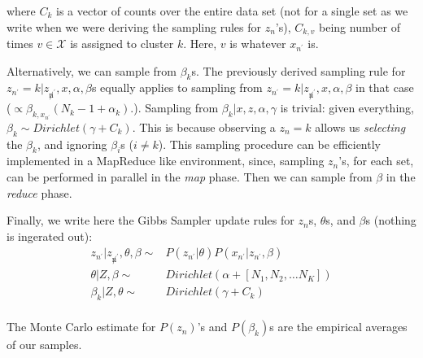 \documentclass{article}%
\begin{document}
where $C_k$ is a vector of counts over the entire data set (not for a single set as we write when we were deriving the sampling rules for $z_n$'s), $C_{k,v}$ being number of times $v\in \mathcal{X}$ is assigned to cluster $k$. Here, $v$ is whatever $x_{n^\prime}$ is. 

Alternatively, we can sample from $\beta_k$s. The previously derived sampling rule for $z_{n^\prime} = k|z_{\not n^\prime}, x, \alpha, \beta$s equally applies to sampling from  $z_{n^\prime} = k|z_{\not n^\prime}, x, \alpha, \beta$ in that case ($ \propto \beta_{k, x_{n^\prime}} (N_k - 1 + \alpha_k).
$). Sampling from $\beta_k|x,z,\alpha,\gamma$ is trivial: given everything, $\beta_k \sim Dirichlet(\gamma + C_k)$. This is because observing a $z_n = k$ allows us \textit{selecting} the $\beta_k$, and ignoring $\beta_{i}$s ($i\neq k$). This sampling procedure can be efficiently implemented in a MapReduce like environment, since, sampling $z_n$'s, for each set, can be performed in parallel in the \textit{map} phase. Then we can sample from $\beta$ in the \textit{reduce} phase.

Finally, we write here the Gibbs Sampler update rules for $z_n$s, $\theta$s, and $\beta$s (nothing is ingerated out):
\begin{align*}
z_{n^\prime}|z_{\not n^\prime},\theta,\beta \sim& P(z_{n^\prime}|\theta) P(x_{n^\prime}|z_{n^\prime}, \beta) \\
\theta|Z, \beta \sim& Dirichlet(\alpha + [N_1, N_2, \dots N_K])\\
\beta_k|Z, \theta \sim& Dirichlet(\gamma + C_k)\\
\end{align*}

The Monte Carlo estimate for $P(z_n)$'s and $P(\beta_k)$s are the empirical averages of our samples.


\end{document}

